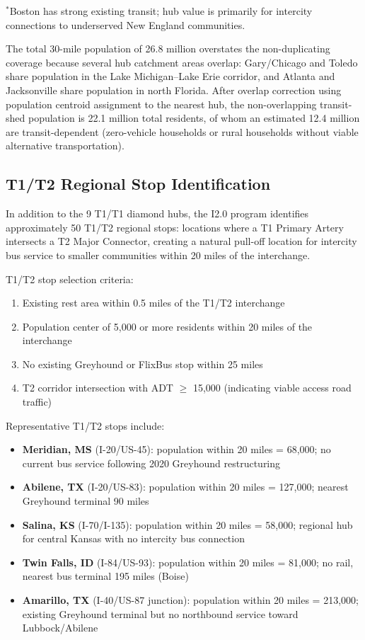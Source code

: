 \noindent $^*$Boston has strong existing transit; hub value is primarily for intercity connections to underserved New England communities.

The total 30-mile population of 26.8 million overstates the non-duplicating coverage because several hub catchment areas overlap: Gary/Chicago and Toledo share population in the Lake Michigan--Lake Erie corridor, and Atlanta and Jacksonville share population in north Florida. After overlap correction using population centroid assignment to the nearest hub, the non-overlapping transit-shed population is 22.1 million total residents, of whom an estimated 12.4 million are transit-dependent (zero-vehicle households or rural households without viable alternative transportation).

\subsection{T1/T2 Regional Stop Identification}

In addition to the 9 T1/T1 diamond hubs, the I2.0 program identifies approximately 50 T1/T2 regional stops: locations where a T1 Primary Artery intersects a T2 Major Connector, creating a natural pull-off location for intercity bus service to smaller communities within 20 miles of the interchange.

T1/T2 stop selection criteria:
\begin{enumerate}
  \item Existing rest area within 0.5 miles of the T1/T2 interchange
  \item Population center of 5,000 or more residents within 20 miles of the interchange
  \item No existing Greyhound or FlixBus stop within 25 miles
  \item T2 corridor intersection with ADT $\geq$ 15,000 (indicating viable access road traffic)
\end{enumerate}

Representative T1/T2 stops include:
\begin{itemize}
  \item \textbf{Meridian, MS} (I-20/US-45): population within 20 miles = 68,000; no current bus service following 2020 Greyhound restructuring
  \item \textbf{Abilene, TX} (I-20/US-83): population within 20 miles = 127,000; nearest Greyhound terminal 90 miles
  \item \textbf{Salina, KS} (I-70/I-135): population within 20 miles = 58,000; regional hub for central Kansas with no intercity bus connection
  \item \textbf{Twin Falls, ID} (I-84/US-93): population within 20 miles = 81,000; no rail, nearest bus terminal 195 miles (Boise)
  \item \textbf{Amarillo, TX} (I-40/US-87 junction): population within 20 miles = 213,000; existing Greyhound terminal but no northbound service toward Lubbock/Abilene
\end{itemize}

